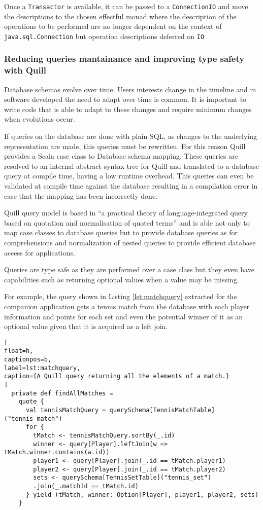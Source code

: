 \documentclass[../main.tex]{subfiles}
\begin{document}
Once a \texttt{Transactor} is available, it can be passed to a \texttt{ConnectionIO} and move the
descriptions to the chosen effectful monad where the description of the
operations to be performed are no longer dependent on the context of
\texttt{java.sql.Connection} but operation descriptions deferred on \texttt{IO}

\subsubsection{Reducing queries mantainance and improving type safety with Quill}
Database schemas evolve over time. Users interests change in the timeline and in
software developed the need to adapt over time is common. It is important to
write code that is able to adapt to these changes and require minimum changes
when evolutions occur.

If queries on the database are done with plain SQL, as changes to the underlying
representation are made, this queries must be rewritten. For this reason Quill
\autocite{Quill}
provides a Scala case class to Database schema mapping. These queries are
resolved to an internal abstract syntax tree for Quill and translated to a
database query at compile time, having a low runtime overhead. This queries can
even be validated at compile time against the database resulting in a
compilation error in case that the mapping has been incorrectly done.

Quill query model is based in ``a  practical  theory  of  language-integrated
query  based  on quotation and normalisation of quoted terms'' \autocite{Cheney2013AQuery} and
is able not only to map case classes to database queries but to provide
database queries as for comprehensions and normalization of nested queries to
provide efficient database access for applications.

Queries are type safe as they are performed over a case class but they even have
capabilities such as returning optional values when a value may be missing.

For example, the query shown in Listing \ref{lst:matchquery} extracted for the companion application gets a tennis
match from the database with each player information and points for each set and
even the potential winner of it as an optional value given that it is acquired
as a left join.

\begin{lstlisting}[
float=h,
captionpos=b,
label=lst:matchquery,
caption={A Quill query returning all the elements of a match.}
]
  private def findAllMatches =
    quote {
      val tennisMatchQuery = querySchema[TennisMatchTable]("tennis_match")
      for {
        tMatch <- tennisMatchQuery.sortBy(_.id)
        winner <- query[Player].leftJoin(w => tMatch.winner.contains(w.id))
        player1 <- query[Player].join(_.id == tMatch.player1)
        player2 <- query[Player].join(_.id == tMatch.player2)
        sets <- querySchema[TennisSetTable]("tennis_set")
        .join(_.matchId == tMatch.id)
      } yield (tMatch, winner: Option[Player], player1, player2, sets)
    }
\end{lstlisting}
\end{document}
